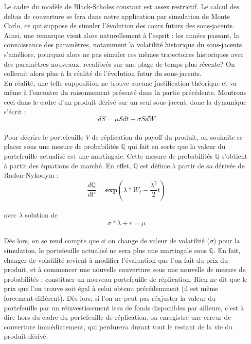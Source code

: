 \documentclass[french,12pt,a4paper]{article}
\begin{document}
Le cadre du modèle de Black-Scholes constant est assez restrictif. Le calcul des deltas de couverture se fera dans notre application par simulation de Monte Carlo, ce qui suppose de simuler l’évolution des cours futurs des sous-jacents. Ainsi, une remarque vient alors naturellement à l'esprit : les années passant, la connaissance des paramètres, notamment la volatilité historique du sous-jacents s’améliore, pourquoi alors ne pas simuler ces mêmes trajectoires historiques avec des paramètres nouveaux, recalibrés sur une plage de temps plus récente? On collerait alors plus à la réalité de l'évolution futur du sous-jacents.\\

En réalité, une telle supposition ne trouve aucune justification théorique et va même à l'encontre du raisonnement présenté dans la partie précédente. Montrons ceci dans le cadre d'un produit dérivé sur un seul sous-jacent, donc la dynamique s’écrit : 
\\$$ dS = \mu Sdt + \sigma SdW $$  \\
Pour décrire le portefeuille $V$ de réplication du payoff du produit, on souhaite se placer sous une mesure de probabilités $\mathbb{Q}$ qui fait en sorte que la valeur du portefeuille actualisé est une martingale. Cette mesure de probabilités $\mathbb{Q}$ s'obtient à partir des équations de marché. En effet, $\mathbb{Q}$ est définie à partir de sa dérivée de Radon-Nykodym :\\
$$\frac{d\mathbb{Q}}{d\mathbb{P}}= \textbf{exp}(\lambda * W_{t} - \frac{\lambda^{2}}{2}t) $$ \\

avec $\lambda$ solution de $$ \sigma * \lambda + r = \mu $$ \\

Dès lors, on se rend compte que si on change de valeur de volatilité ($\sigma$) pour la simulation, le portefeuille actualisé ne sera plus une martingale sous $\mathbb{Q}$. En fait, changer de volatilité revient à modifier l'évaluation que l'on fait du prix du produit, et à commencer une nouvelle couverture sous une nouvelle de mesure de probabilités : constituer un nouveau portefeuille de réplication. Rien ne dit que le prix que l'on trouve soit égal à celui obtenu précédemment (il est même forcement différent). Dès lors, si l'on ne peut pas réajuster la valeur du portefeuille par un réinvestissement issu de fonds disponibles par ailleurs, c'est à dire hors du cadre du portefeuille de réplication, on enregistre une erreur de couverture immédiatement, qui perdurera durant tout le restant de la vie du produit dérivé.\\
\end{document}
